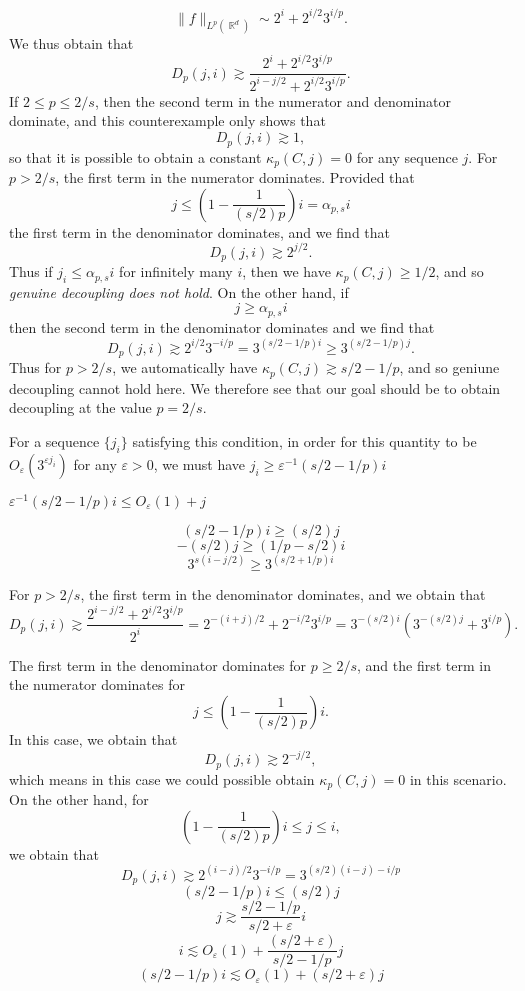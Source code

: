 \documentclass[dvipsnames,letterpaper,12pt]{article}
\numberwithin{equation}{section}
\DeclareMathOperator{\RR}{\mathbb{R}}
\numberwithin{theorem}{section}
\begin{document}
%
\[ \| f \|_{L^p(\RR^d)} \sim 2^i + 2^{i/2} 3^{i/p}. \]
%
We thus obtain that
%
\[ D_p(j,i) \gtrsim \frac{2^i + 2^{i/2} 3^{i/p}}{2^{i-j/2} + 2^{i/2} 3^{i/p}}. \]
%
If $2 \leq p \leq 2/s$, then the second term in the numerator and denominator dominate, and this counterexample only shows that
%
\[ D_p(j,i) \gtrsim 1, \]
%
so that it is possible to obtain a constant $\kappa_p(C,j) = 0$ for any sequence $j$. For $p > 2/s$, the first term in the numerator dominates. Provided that
%
\[ j \leq \left( 1 - \frac{1}{(s/2) p} \right) i = \alpha_{p,s} i \]
%
the first term in the denominator dominates, and we find that
%
\[ D_p(j,i) \gtrsim 2^{j/2}. \]
%
Thus if $j_i \leq \alpha_{p,s} i$ for infinitely many $i$, then we have $\kappa_p(C,j) \geq 1/2$, and so \emph{genuine decoupling does not hold}. On the other hand, if
%
\[ j \geq \alpha_{p,s} i \]
%
then the second term in the denominator dominates and we find that
%
\[ D_p(j,i) \gtrsim 2^{i/2} 3^{-i/p} = 3^{(s/2 - 1/p) i} \geq 3^{(s/2 - 1/p) j}. \]
%
Thus for $p > 2/s$, we automatically have $\kappa_p(C,j) \gtrsim s/2 - 1/p$, and so geniune decoupling cannot hold here. We therefore see that our goal should be to obtain decoupling at the value $p = 2/s$.



For a sequence $\{ j_i \}$ satisfying this condition, in order for this quantity to be $O_\varepsilon( 3^{\varepsilon j_i} )$ for any $\varepsilon > 0$, we must have $j_i \geq \varepsilon^{-1}(s/2 - 1/p) i$

 $\varepsilon^{-1} (s/2 - 1/p) i \leq O_\varepsilon(1) + j$



\[ (s/2 - 1/p) i \geq (s/2) j \]
\[ -(s/2)j \geq (1/p - s/2)i \]
\[ 3^{s(i-j/2)} \geq 3^{(s/2 + 1/p)i} \]


For $p > 2/s$, the first term in the denominator dominates, and we obtain that
%
\[ D_p(j,i) \gtrsim \frac{2^{i-j/2} + 2^{i/2} 3^{i/p}}{2^i} = 2^{-(i+j)/2} + 2^{-i/2} 3^{i/p} = 3^{-(s/2)i} ( 3^{-(s/2)j} + 3^{i/p}). \]


The first term in the denominator dominates for $p \geq 2/s$, and the first term in the numerator dominates for
%
\[ j \leq \left( 1 - \frac{1}{(s/2) p} \right) i. \]
%
In this case, we obtain that
%
\[ D_p(j,i) \gtrsim 2^{-j/2}, \]
%
which means in this case we could possible obtain $\kappa_p(C,j) = 0$ in this scenario. On the other hand, for
%
\[ \left( 1 - \frac{1}{(s/2) p} \right) i \leq j \leq i, \]
%
we obtain that
%
\[ D_p(j,i) \gtrsim 2^{(i - j)/2} 3^{-i/p} = 3^{(s/2)(i - j) - i/p} \]
%
\[ (s/2 - 1/p) i \leq (s/2) j \]
\[ j \gtrsim \frac{s/2 - 1/p}{s/2 + \varepsilon} i \]
\[ i \lesssim O_\varepsilon(1) + \frac{(s/2 + \varepsilon)}{s/2 - 1/p} j \]
\[ (s/2 - 1/p) i \lesssim O_\varepsilon(1) + (s/2 + \varepsilon) j \]
\end{document}

